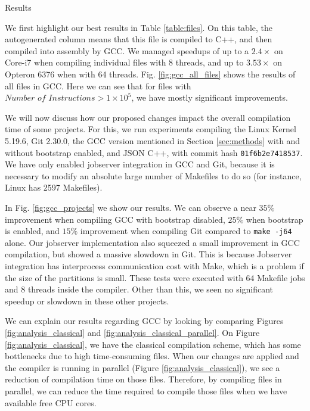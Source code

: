 \begin{subsection}{Results}\label{sec:lto-results}

We first highlight our best results in Table \ref{table:files}. On this table,
the autogenerated column means that this file is compiled to C++, and then compiled
into assembly by GCC. We managed speedups of up to a $2.4\times$ on Core-i7 when
compiling individual files with 8 threads, and up to $3.53\times$ on Opteron 6376 when
with 64 threads. Fig. \ref{fig:gcc_all_files} shows the results
of all files in GCC. Here we can see that for files with $\textit{Number of Instructions} >
1 \times 10^5$, we have mostly significant improvements.

We will now discuss how our proposed changes impact the overall compilation
time of some projects. For this, we run experiments compiling
the Linux Kernel 5.19.6, Git 2.30.0, the GCC version mentioned in
Section \ref{sec:methods} with and without bootstrap enabled, and JSON C++, with
commit hash \texttt{01f6b2e7418537}. We have only enabled jobserver integration
in GCC and Git, because it is necessary to modify an absolute large number
of Makefiles to do so (for instance, Linux has 2597 Makefiles).

In Fig. \ref{fig:gcc_projects} we show our results. We can observe a near
$35\%$ improvement when compiling GCC with bootstrap disabled, $25\%$ when
bootstrap is enabled, and $15\%$ improvement when compiling Git compared to
\texttt{make -j64} alone. Our jobserver implementation also squeezed a small
improvement in GCC compilation, but showed a massive slowdown in Git. This is
because Jobserver integration has interprocess communication cost
with Make, which is a problem if the size of the partitions is small.  These
tests were executed with 64 Makefile jobs and 8 threads inside the compiler.
Other than this, we seen no significant speedup or slowdown in these other
projects.

We can explain our results regarding GCC by looking by comparing Figures
\ref{fig:analysis_classical} and \ref{fig:analysis_classical_parallel}. On
Figure \ref{fig:analysis_classical}, we have the classical compilation scheme,
which has some bottlenecks due to high time-consuming files. When our changes
are applied and the compiler is running in parallel (Figure
\ref{fig:analysis_classical}), we see a reduction of compilation time on those
files. Therefore, by compiling files in parallel, we can reduce the time
required to compile those files when we have available free CPU cores.


\end{subsection}
